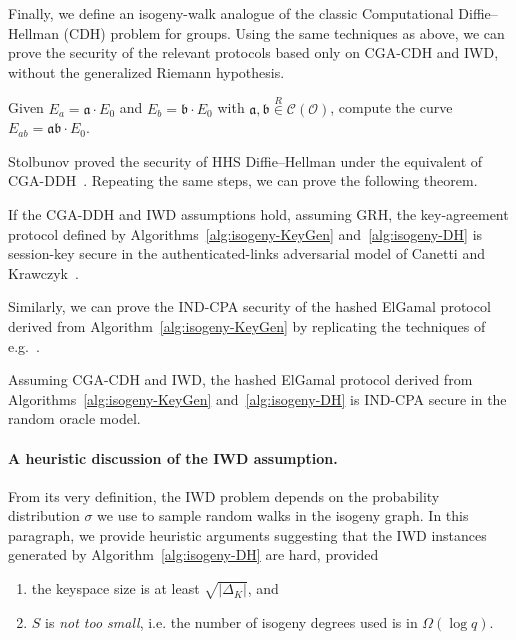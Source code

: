 \documentclass{llncs}
\newcommand{\Cl}{\mathcal{C}}
\renewcommand{\O}{\mathcal{O}}
\renewcommand{\frak}{\mathfrak}
\newcommand{\rand}[1]{\overset{#1}{∈}}
\newcommand{\uni}{\rand{R}}
\begin{document}
Finally, we define an isogeny-walk analogue of the classic 
Computational Diffie--Hellman (CDH) problem for groups.
Using the same techniques as above, we can prove the
security of the relevant protocols based only on CGA-CDH and IWD,
without the generalized Riemann hypothesis.

\begin{definition}
    Given $E_a=\frak a·E_0$ and $E_b=\frak b·E_0$ 
    with $\frak a,\frak b\uni\Cl(\O)$, 
    compute the curve $E_{ab}=\frak{ab}·E_0$.
\end{definition}

Stolbunov proved
the security of HHS Diffie--Hellman under the equivalent of CGA-DDH~\cite{Stol}.
Repeating the same steps, we can prove the following theorem.

\begin{theorem}
    If the CGA-DDH and IWD assumptions hold, assuming GRH, 
    the key-agreement protocol defined by 
    Algorithms~\ref{alg:isogeny-KeyGen} and~\ref{alg:isogeny-DH}
    is session-key secure in the authenticated-links adversarial model 
    of Canetti and Krawczyk~\cite{canetti}.
\end{theorem}

Similarly, we can prove the IND-CPA security of the hashed ElGamal
protocol derived from Algorithm~\ref{alg:isogeny-KeyGen} by replicating the
techniques of e.g.~\cite[\S20.4.11]{galbraith2012mathematics}.

\begin{theorem}
    Assuming CGA-CDH and IWD, the hashed ElGamal protocol derived from
    Algorithms~\ref{alg:isogeny-KeyGen} and~\ref{alg:isogeny-DH}
    is IND-CPA secure in the random oracle model.
\end{theorem}


\paragraph{A heuristic discussion of the IWD assumption.}

From its very definition, the IWD problem depends on
the probability distribution $σ$ we use to sample
random walks in the isogeny graph. In this paragraph,
we provide heuristic arguments suggesting that 
the IWD instances generated by Algorithm~\ref{alg:isogeny-DH} are hard,
provided
\begin{enumerate}
    \item the keyspace size is at least $\sqrt{|Δ_K|}$, and
    \item $S$ is \emph{not too small}, i.e. the number of
        isogeny degrees used is in $\Omega(\log q)$.
\end{enumerate}
\end{document}
